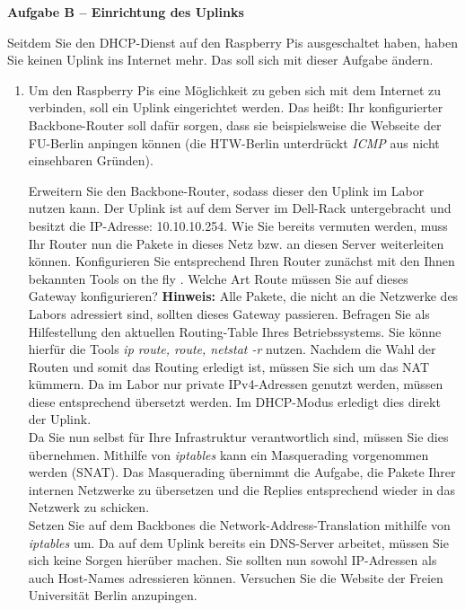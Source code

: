 \documentclass[paper=a4,fontsize=11pt]{scrartcl}%
\numberwithin{equation}{section}
\begin{document}
\begin{center}\Large{\textbf{Aufgabe B -- Einrichtung des Uplinks}}\end{center}\vskip0.25in
Seitdem Sie den DHCP-Dienst auf den Raspberry Pis ausgeschaltet haben, haben Sie keinen Uplink ins Internet mehr. Das soll sich mit dieser Aufgabe ändern.
\begin{enumerate}
	\item Um den Raspberry Pis eine Möglichkeit zu geben sich mit dem Internet zu verbinden, soll ein Uplink eingerichtet werden. Das heißt: Ihr konfigurierter Backbone-Router soll dafür sorgen, dass sie beispielsweise die Webseite der FU-Berlin anpingen können (die HTW-Berlin unterdrückt \emph{ICMP} aus nicht einsehbaren Gründen).
\begin{tasks}
  \task Erweitern Sie den Backbone-Router, sodass dieser den Uplink im Labor nutzen kann. Der Uplink ist auf dem Server im Dell-Rack untergebracht und besitzt die IP-Adresse: 10.10.10.254. Wie Sie bereits vermuten werden, muss Ihr Router nun die Pakete in dieses Netz bzw. an diesen Server weiterleiten können. Konfigurieren Sie entsprechend Ihren Router zunächst mit den Ihnen bekannten Tools \glqq on the fly \grqq.
  \task Welche Art Route müssen Sie auf dieses Gateway konfigurieren? \textbf{Hinweis:} Alle Pakete, die nicht an die Netzwerke des Labors adressiert sind, sollten dieses Gateway passieren.
  \task Befragen Sie als Hilfestellung den aktuellen Routing-Table Ihres Betriebssystems. Sie könne hierfür die Tools \emph{ip route, route, netstat -r} nutzen.
  \task Nachdem die Wahl der Routen und somit das Routing erledigt ist, müssen Sie sich um das NAT kümmern. Da im Labor nur private IPv4-Adressen genutzt werden, müssen diese entsprechend übersetzt werden. Im DHCP-Modus erledigt dies direkt der Uplink.\\
  Da Sie nun selbst für Ihre Infrastruktur verantwortlich sind, müssen Sie dies übernehmen. Mithilfe von \emph{iptables} kann ein Masquerading vorgenommen werden (SNAT). Das Masquerading übernimmt die Aufgabe, die Pakete Ihrer internen Netzwerke zu übersetzen und die Replies entsprechend wieder in das Netzwerk zu schicken.\\
  Setzen Sie auf dem Backbones die Network-Address-Translation mithilfe von \emph{iptables} um.
  \task Da auf dem Uplink bereits ein DNS-Server arbeitet, müssen Sie sich keine Sorgen hierüber machen. Sie sollten nun sowohl IP-Adressen als auch Host-Names adressieren können.
  \task Versuchen Sie die Website der Freien Universität Berlin anzupingen.
\end{tasks}
\end{enumerate}
\end{document}
